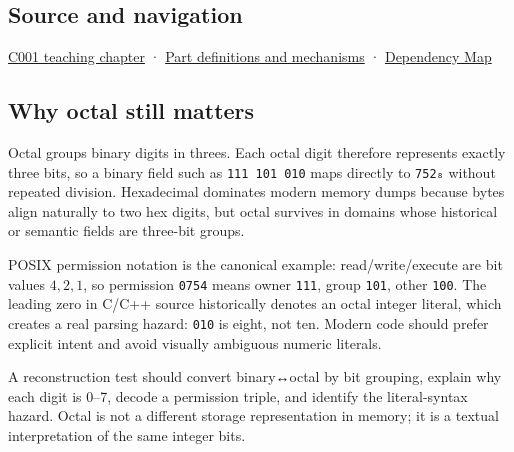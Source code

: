 \subsection{Source and navigation}\label{appendix-17fc1bc8b305-source-and-navigation}

\hyperref[01-foundations-i-ch001-from-a-signal-to-an-interpretation]{C001 teaching chapter} · \hyperref[appendix-fd090d982a15]{Part definitions and mechanisms} · \hyperref[appendix-4ad47bdd269a]{Dependency Map}

\subsection{Why octal still matters}\label{appendix-17fc1bc8b305-why-octal-still-matters}

Octal groups binary digits in threes. Each octal digit therefore represents exactly three bits, so a binary field such as \texttt{111\ 101\ 010} maps directly to \texttt{752₈} without repeated division. Hexadecimal dominates modern memory dumps because bytes align naturally to two hex digits, but octal survives in domains whose historical or semantic fields are three-bit groups.

POSIX permission notation is the canonical example: read/write/execute are bit values \(4,2,1\), so permission \texttt{0754} means owner \texttt{111}, group \texttt{101}, other \texttt{100}. The leading zero in C/C++ source historically denotes an octal integer literal, which creates a real parsing hazard: \texttt{010} is eight, not ten. Modern code should prefer explicit intent and avoid visually ambiguous numeric literals.

A reconstruction test should convert binary↔octal by bit grouping, explain why each digit is 0--7, decode a permission triple, and identify the literal-syntax hazard. Octal is not a different storage representation in memory; it is a textual interpretation of the same integer bits.
